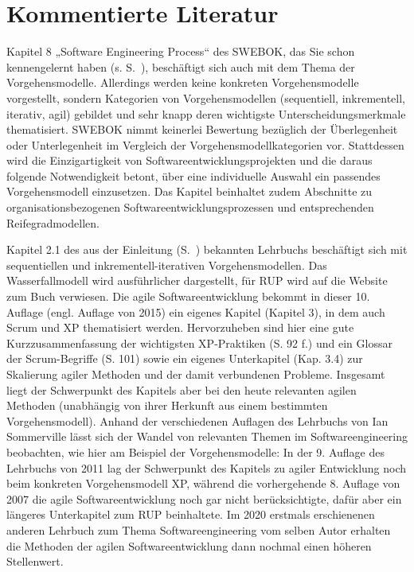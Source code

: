 \section{Kommentierte Literatur}
\label{sec:Kap-2.4}

{Kapitel 8 „Software Engineering Process“ des SWEBOK, das Sie schon kennengelernt haben (s. S.~\pageref{sec:Kap-1.4:Bourque}), beschäftigt sich auch mit dem Thema der Vorgehensmodelle. Allerdings werden keine konkreten Vorgehensmodelle vorgestellt, sondern Kategorien von Vorgehensmodellen (sequentiell, inkrementell, iterativ, agil) gebildet und sehr knapp deren wichtigste Unterscheidungsmerkmale thematisiert. SWEBOK nimmt keinerlei Bewertung bezüglich der Überlegenheit oder Unterlegenheit im Vergleich der Vorgehensmodellkategorien vor. Stattdessen wird die Einzigartigkeit von Softwareentwicklungsprojekten und die daraus folgende Notwendigkeit betont, über eine individuelle Auswahl ein passendes Vorgehensmodell einzusetzen. Das Kapitel be\-inhal\-tet zudem Abschnitte zu organisationsbezogenen Softwareentwicklungsprozessen und entsprechenden Reifegradmodellen.}

{Kapitel 2.1 des aus der Einleitung (S.~\pageref{sec:Kap-0.3:Sommerville}) bekannten Lehrbuchs beschäftigt sich mit sequentiellen und in\-kre\-men\-tell-ite\-ra\-ti\-ven Vorgehensmodellen. Das Wasserfallmodell wird ausführlicher dargestellt, für RUP wird auf die Website zum Buch verwiesen. Die agile Softwareentwicklung bekommt in dieser 10. Auflage (engl. Auflage von 2015) ein eigenes Kapitel (Kapitel 3), in dem auch Scrum und XP thematisiert werden. Hervorzuheben sind hier eine gute Kurzzusammenfassung der wichtigsten XP-Praktiken (S. 92 f.) und ein Glossar der Scrum-Begriffe (S. 101) sowie ein eigenes Unterkapitel (Kap. 3.4) zur Skalierung agiler Methoden und der damit verbundenen Probleme. Insgesamt liegt der Schwerpunkt des Kapitels aber bei den heute relevanten agilen Methoden (unabhängig von ihrer Herkunft aus einem bestimmten Vorgehensmodell). Anhand der verschiedenen Auflagen des Lehrbuchs von Ian Sommerville lässt sich der Wandel von relevanten Themen im Softwareengineering beobachten, wie hier am Beispiel der Vorgehensmodelle: In der 9. Auflage des Lehrbuchs von 2011 lag der Schwerpunkt des Kapitels zu agiler Entwicklung noch beim konkreten Vorgehensmodell XP, während die vorhergehende 8. Auflage von 2007 die agile Softwareentwicklung noch gar nicht berücksichtigte, dafür aber ein längeres Unterkapitel zum RUP beinhaltete. Im 2020 erstmals erschienenen anderen Lehrbuch zum Thema Softwareengineering \cite{som20} vom selben Autor erhalten die Methoden der agilen Softwareentwicklung dann nochmal einen höheren Stellenwert.}

